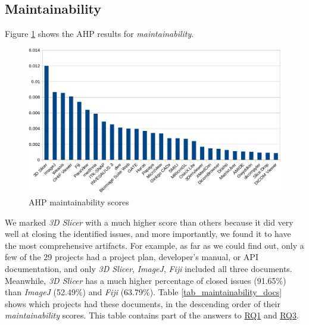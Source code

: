 \documentclass[preprint,12pt,authoryear]{elsarticle}
\begin{document}
\subsection{Maintainability} \label{sec_score_maintainability}

Figure \ref{fg_maintainability_scores} shows the AHP results for
\textit{maintainability}. 

\begin{figure}[ht]
\includegraphics[scale=0.38]{figures/maintainability_scores.png}
\caption{AHP maintainability scores}
\label{fg_maintainability_scores}
\end{figure}

We marked \textit{3D Slicer} with a much higher score than others because it did
very well at closing the identified issues, and more importantly, we found it to
have the most comprehensive artifacts. For example, as far as we could find out,
only a few of the 29 projects had a project plan, developer's manual, or API
documentation, and only \textit{3D Slicer}, \textit{ImageJ}, \textit{Fiji}
included all three documents. Meanwhile, \textit{3D Slicer} has a much higher
percentage of closed issues (91.65\%) than \textit{ImageJ} (52.49\%) and
\textit{Fiji} (63.79\%). Table \ref{tab_maintainability_docs} shows which
projects had these documents, in the descending order of their
\textit{maintainability} scores. This table contains part of the answers to
\hyperlink{rq1}{RQ1} and \hyperlink{rq3}{RQ3}.
\end{document}
